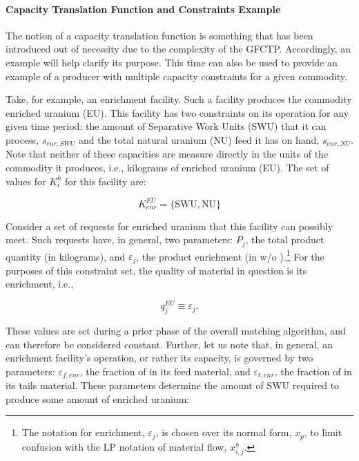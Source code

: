 \paragraph{Capacity Translation Function and Constraints Example}

The notion of a capacity translation function is something that has been
introduced out of necessity due to the complexity of the GFCTP. Accordingly, an
example will help clarify its purpose. This time can also be used to provide an
example of a producer with multiple capacity constraints for a given commodity.

Take, for example, an enrichment facility. Such a facility produces the
commodity enriched uranium (EU). This facility has two constraints on its
operation for any given time period: the amount of Separative Work Units (SWU)
that it can process, $s_{enr,SWU}$ and the total natural uranium (NU) feed it
has on hand, $s_{enr,NU}$. Note that neither of these capacities are measure
directly in the units of the commodity it produces, i.e., kilograms of enriched
uranium (EU). The set of values for $K_{i}^{h}$ for this facility are:

\begin{equation}\label{eqs:enr-constr-commods}
  K_{enr}^{EU} = \{ \mbox{SWU}, \mbox{NU} \}
\end{equation}

Consider a set of requests for enriched uranium that this facility can possibly
meet. Such requests have, in general, two parameters: $P_{j}$, the total product
quantity (in kilograms), and $\varepsilon_{j}$, the product enrichment (in w/o
).\footnote{The notation for enrichment, $\varepsilon_{j}$, is chosen over its
normal form, $x_p$, to limit confusion with the LP notation of material flow,
$x^h_{i,j}$.}  For the purposes of this constraint set, the quality of material
in question is its enrichment, i.e.,

\begin{equation}\label{eqs:enr-q-swu}
  q_{j}^{EU} \equiv \varepsilon_{j}.
\end{equation}

These values are set during a prior phase of the overall matching algorithm, and
can therefore be considered constant. Further, let us note that, in general, an
enrichment facility's operation, or rather its capacity, is governed by two
parameters: $\varepsilon_{f,enr}$, the fraction of  in its feed material, and
$\varepsilon_{t,enr}$, the fraction of  in its tails material. These parameters
determine the amount of SWU required to produce some amount of enriched uranium:


